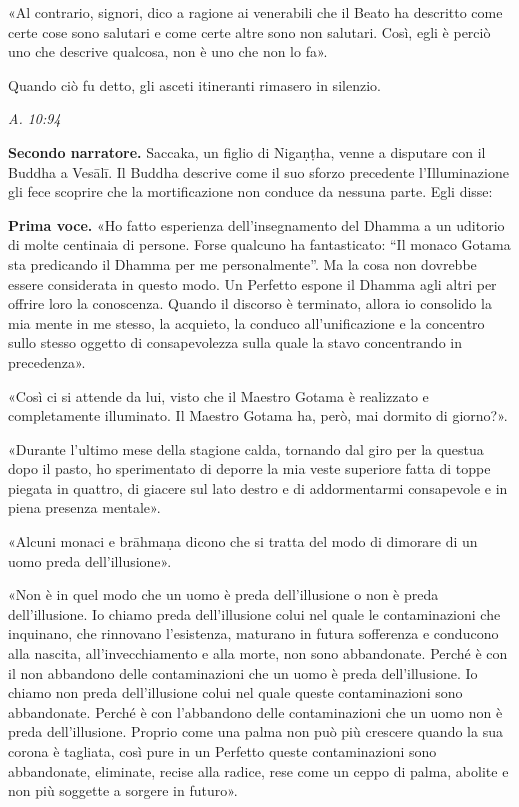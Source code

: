 «Al contrario, signori, dico a ragione ai venerabili che il Beato ha
descritto come certe cose sono salutari e come certe altre sono non
salutari. Così, egli è perciò uno che descrive qualcosa, non è uno che
non lo fa».


Quando ciò fu detto, gli asceti itineranti rimasero in silenzio.


\emph{A. 10:94}


\textbf{Secondo narratore.} Saccaka, un figlio di Nigaṇṭha, venne a disputare con
il Buddha a Vesālī. Il Buddha descrive come il suo sforzo precedente
l’Illuminazione gli fece scoprire che la mortificazione non conduce da
nessuna parte. Egli disse:


\textbf{Prima voce.} «Ho fatto esperienza dell’insegnamento del Dhamma a
un uditorio di molte centinaia di persone. Forse qualcuno ha
fantasticato: “Il monaco Gotama sta predicando il Dhamma per me
personalmente”. Ma la cosa non dovrebbe essere considerata in questo
modo. Un Perfetto espone il Dhamma agli altri per offrire loro la
conoscenza. Quando il discorso è terminato, allora io consolido la mia
mente in me stesso, la acquieto, la conduco all’unificazione e la
concentro sullo stesso oggetto di consapevolezza sulla quale la stavo
concentrando in precedenza».


«Così ci si attende da lui, visto che il Maestro Gotama è realizzato e
completamente illuminato. Il Maestro Gotama ha, però, mai dormito di
giorno?».


«Durante l’ultimo mese della stagione calda, tornando dal giro per la
questua dopo il pasto, ho sperimentato di deporre la mia veste superiore
fatta di toppe piegata in quattro, di giacere sul lato destro e di
addormentarmi consapevole e in piena presenza mentale».


«Alcuni monaci e brāhmaṇa dicono che si tratta del modo di dimorare di
un uomo preda dell’illusione».


«Non è in quel modo che un uomo è preda dell’illusione o non è preda
dell’illusione. Io chiamo preda dell’illusione colui nel quale le
contaminazioni che inquinano, che rinnovano l’esistenza, maturano in
futura sofferenza e conducono alla nascita, all’invecchiamento e alla
morte, non sono abbandonate. Perché è con il non abbandono delle
contaminazioni che un uomo è preda dell’illusione. Io chiamo non preda
dell’illusione colui nel quale queste contaminazioni sono abbandonate.
Perché è con l’abbandono delle contaminazioni che un uomo non è preda
dell’illusione. Proprio come una palma non può più crescere quando la
sua corona è tagliata, così pure in un Perfetto queste contaminazioni
sono abbandonate, eliminate, recise alla radice, rese come un ceppo di
palma, abolite e non più soggette a sorgere in futuro».



